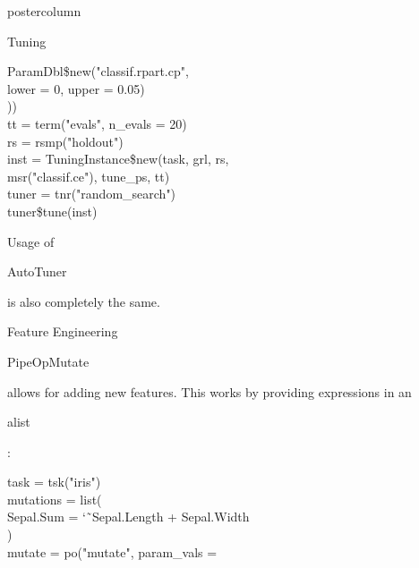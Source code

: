 \documentclass{beamer}
\newcommand{\codeinline}[1]{\begin{codeboxinline}#1\end{codeboxinline}}
\begin{document}
\begin{frame}[fragile]{}
\begin{columns}
\begin{column}{.245\textwidth}
\begin{beamercolorbox}[center]{postercolumn}
\begin{minipage}{.98\textwidth}
{\begin{myblock}{Tuning}
\begin{codeboxexample}
{               %
               \hspace*{1ex} ParamDbl\$new("classif.rpart.cp",\\
               \hspace*{3ex} lower = 0, upper = 0.05)\\
               ))\\
               tt = term("evals", n\_evals = 20)\\
               rs = rsmp("holdout")\\
               inst = TuningInstance\$new(task, grl, rs,\\
               \hspace*{1ex} msr("classif.ce"), tune\_ps, tt)\\
               tuner = tnr("random\_search")\\
               tuner\$tune(inst)
           }
				\end{codeboxexample}
            Usage of \codeinline{AutoTuner} is also completely the same.
            \end{myblock}
              \vspace{-1.0em}
          \begin{myblock}{Feature Engineering}
            \codeinline{PipeOpMutate} allows for adding new features. This works by providing expressions in an \codeinline{alist}:
            \begin{codeboxexample}
              \footnotesize{
              task = tsk("iris")\\
              mutations = list(\\
              \hspace*{1ex} Sepal.Sum = \char`\~ \ Sepal.Length + Sepal.Width\\
              )\\
              mutate = po("mutate", param\_vals =\\
}
\end{codeboxexample}
\end{myblock}}
\end{minipage}
\end{beamercolorbox}
\end{column}
\end{columns}
\end{frame}
\end{document}

